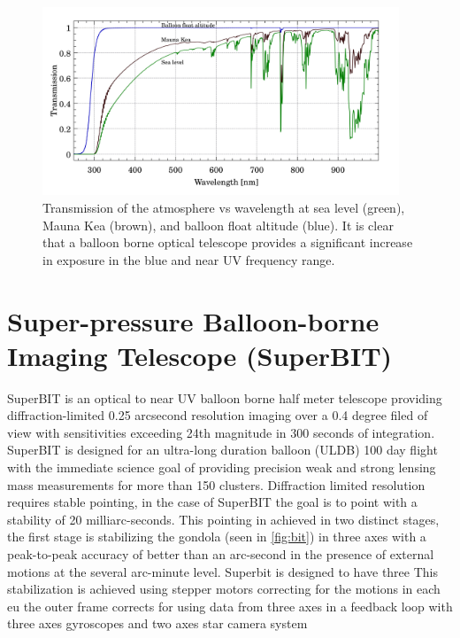 \begin{figure}
    \begin{small}
        \begin{center}
            \includegraphics[width=0.95\textwidth]{Introduction/figs/atmosphere.jpg}
        \end{center}
        \caption{Transmission of the atmosphere vs wavelength at sea level (green), Mauna Kea (brown), and balloon float altitude (blue). It is clear that a balloon borne optical telescope provides a significant increase in exposure in the blue and near UV frequency range.}
        \label{fig:atmos}
    \end{small}
\end{figure}


\section{Super-pressure Balloon-borne Imaging Telescope (SuperBIT)}
SuperBIT is an optical to near UV balloon borne half meter telescope providing diffraction-limited 0.25 arcsecond resolution imaging over a 0.4 degree filed of view with sensitivities exceeding 24th magnitude in 300 seconds of integration. SuperBIT is designed for an ultra-long duration balloon (ULDB) 100 day flight with the immediate science goal of providing precision weak and strong lensing mass measurements for more than 150 clusters. Diffraction limited resolution requires stable pointing, in the case of SuperBIT the goal is to point with a stability of 20 milliarc-seconds. This pointing in achieved in two distinct stages, the first stage is stabilizing the gondola (seen in \autoref{fig:bit}) in three axes with a peak-to-peak accuracy of better than an arc-second in the presence of external motions at the several arc-minute level. Superbit is designed to have three This stabilization is achieved using stepper motors correcting for the motions in each eu the outer frame corrects for  using data from three axes  in a feedback loop with three axes gyroscopes and two axes star camera system


